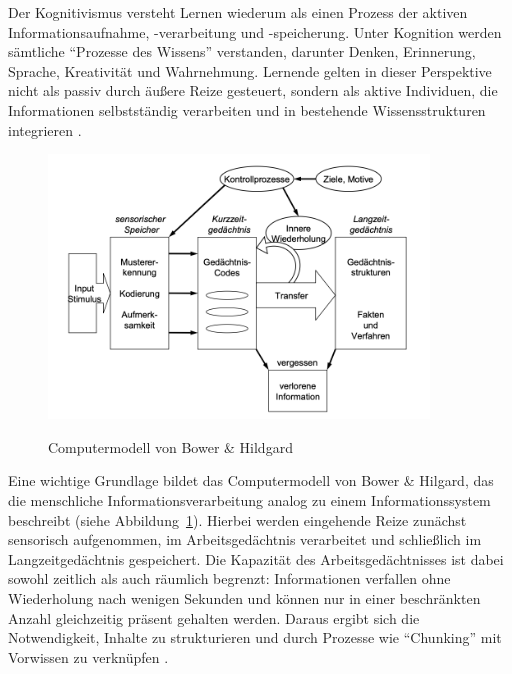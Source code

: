 Der Kognitivismus versteht Lernen wiederum als einen Prozess der aktiven Informationsaufnahme, -verarbeitung und -speicherung. Unter Kognition werden sämtliche \enquote{Prozesse des Wissens} verstanden, darunter Denken, Erinnerung, Sprache, Kreativität und Wahrnehmung. Lernende gelten in dieser Perspektive nicht als passiv durch äußere Reize gesteuert, sondern als aktive Individuen, die Informationen selbstständig verarbeiten und in bestehende Wissensstrukturen integrieren \parencite[S.~1]{furstenau_lehr-lern-theorien_2019}.

\begin{figure}[htbp]
    \centering
    \includegraphics[width=0.90\textwidth]{img/Computermodell.png}
    \caption{Computermodell von Bower \& Hildgard }
	\parencite[S.~234]{bower_theorie_1984}
    \label{fig:computermodell}
\end{figure}

Eine wichtige Grundlage bildet das Computermodell von Bower \& Hilgard, das die menschliche Informationsverarbeitung analog zu einem Informationssystem beschreibt (siehe Abbildung~\ref{fig:computermodell}). Hierbei werden eingehende Reize zunächst sensorisch aufgenommen, im Arbeitsgedächtnis verarbeitet und schließlich im Langzeitgedächtnis gespeichert. Die Kapazität des Arbeitsgedächtnisses ist dabei sowohl zeitlich als auch räumlich begrenzt: Informationen verfallen ohne Wiederholung nach wenigen Sekunden und können nur in einer beschränkten Anzahl gleichzeitig präsent gehalten werden. Daraus ergibt sich die Notwendigkeit, Inhalte zu strukturieren und durch Prozesse wie \enquote{Chunking} mit Vorwissen zu verknüpfen \parencite[S.~15]{pfeiffer_simulationsumgebungen_2008}.

